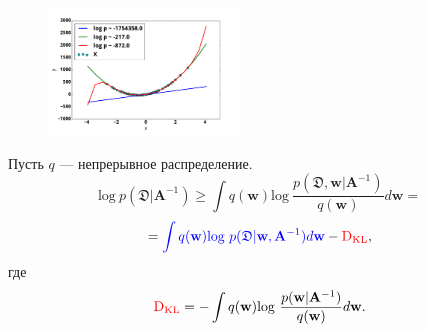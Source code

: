 \documentclass[11pt,pdf,utf8,russian,aspectratio=169]{beamer}
\begin{document}
\begin{frame}
\begin{multicols}{2}
\begin{figure}[h]                                                                                                                               
\includegraphics[width=0.45\textwidth]{./slide_plots/example.pdf}                                                                                      
\end{figure}                                                                                                                                    
\columnbreak
Пусть $q$ --- непрерывное распределение.
$$                                                                                                                                              
        \text{log}~p(\mathfrak{D}|\mathbf{A}^{-1}) \geq \int q(\mathbf{w})\text{log}~\frac{p(\mathfrak{D},\mathbf{w}|\mathbf{A}^{-1})}{q(\mathbf{w})}d\mathbf{w} =                                                                                                                                        
$$           
$$                                                                                                                                              
        = \textcolor{blue}{\int q(\mathbf{w})\text{log}~{p(\mathfrak{D} | \mathbf{w},\mathbf{A}^{-1})}d \mathbf{w}}  - \textcolor{red}{\text{D}_{\text{KL}}
} ,                                                                                                                                
$$      
где $$\textcolor{red}{\text{D}_{\text{KL}}} = -\int q(\mathbf{w})\text{log}~\frac{p(\mathbf{w} |\mathbf{A}^{-1})}{q(\mathbf{w})}d\mathbf{w}.$$ 

\end{multicols}
\end{frame}                                                                                                                                     
              
\end{document}
